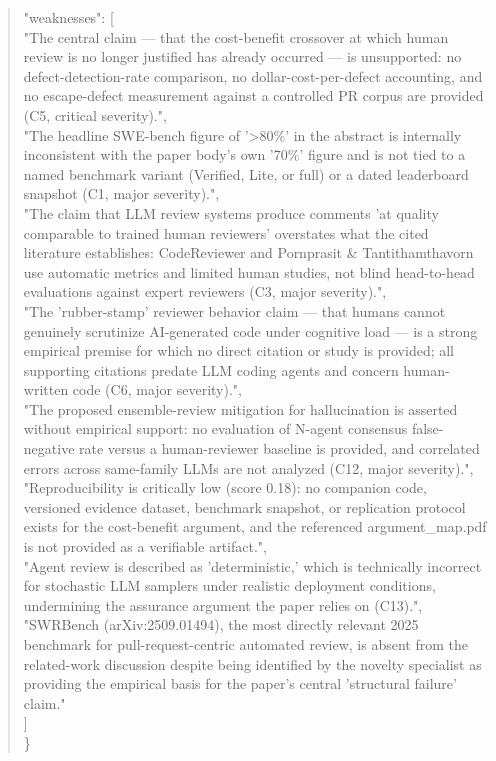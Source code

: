 \documentclass[11pt]{article}
\begin{document}
\begin{quote}
  "weaknesses": [\\
    "The central claim --- that the cost-benefit crossover at which human review is no longer justified has already occurred --- is unsupported: no defect-detection-rate comparison, no dollar-cost-per-defect accounting, and no escape-defect measurement against a controlled PR corpus are provided (C5, critical severity).",\\
    "The headline SWE-bench figure of '>80\%' in the abstract is internally inconsistent with the paper body's own '70\%' figure and is not tied to a named benchmark variant (Verified, Lite, or full) or a dated leaderboard snapshot (C1, major severity).",\\
    "The claim that LLM review systems produce comments 'at quality comparable to trained human reviewers' overstates what the cited literature establishes: CodeReviewer and Pornprasit \& Tantithamthavorn use automatic metrics and limited human studies, not blind head-to-head evaluations against expert reviewers (C3, major severity).",\\
    "The 'rubber-stamp' reviewer behavior claim --- that humans cannot genuinely scrutinize AI-generated code under cognitive load --- is a strong empirical premise for which no direct citation or study is provided; all supporting citations predate LLM coding agents and concern human-written code (C6, major severity).",\\
    "The proposed ensemble-review mitigation for hallucination is asserted without empirical support: no evaluation of N-agent consensus false-negative rate versus a human-reviewer baseline is provided, and correlated errors across same-family LLMs are not analyzed (C12, major severity).",\\
    "Reproducibility is critically low (score 0.18): no companion code, versioned evidence dataset, benchmark snapshot, or replication protocol exists for the cost-benefit argument, and the referenced argument\_map.pdf is not provided as a verifiable artifact.",\\
    "Agent review is described as 'deterministic,' which is technically incorrect for stochastic LLM samplers under realistic deployment conditions, undermining the assurance argument the paper relies on (C13).",\\
    "SWRBench (arXiv:2509.01494), the most directly relevant 2025 benchmark for pull-request-centric automated review, is absent from the related-work discussion despite being identified by the novelty specialist as providing the empirical basis for the paper's central 'structural failure' claim."\\
  ]\\
\}\\
\end{quote}
\end{document}
